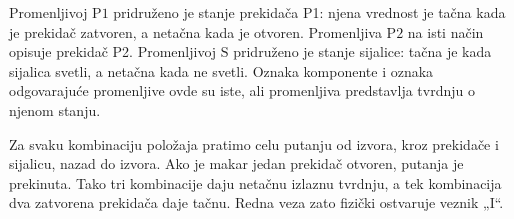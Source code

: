 
Promenljivoj \(\mathrm{P1}\) pridruženo je stanje prekidača P1: njena vrednost je tačna kada je prekidač zatvoren, a netačna kada je otvoren. Promenljiva \(\mathrm{P2}\) na isti način opisuje prekidač P2. Promenljivoj \(\mathrm{S}\) pridruženo je stanje sijalice: tačna je kada sijalica svetli, a netačna kada ne svetli. Oznaka komponente i oznaka odgovarajuće promenljive ovde su iste, ali promenljiva predstavlja tvrdnju o njenom stanju.

Za svaku kombinaciju položaja pratimo celu putanju od izvora, kroz prekidače i sijalicu, nazad do izvora. Ako je makar jedan prekidač otvoren, putanja je prekinuta. Tako tri kombinacije daju netačnu izlaznu tvrdnju, a tek kombinacija dva zatvorena prekidača daje tačnu. Redna veza zato fizički ostvaruje veznik „I“.
